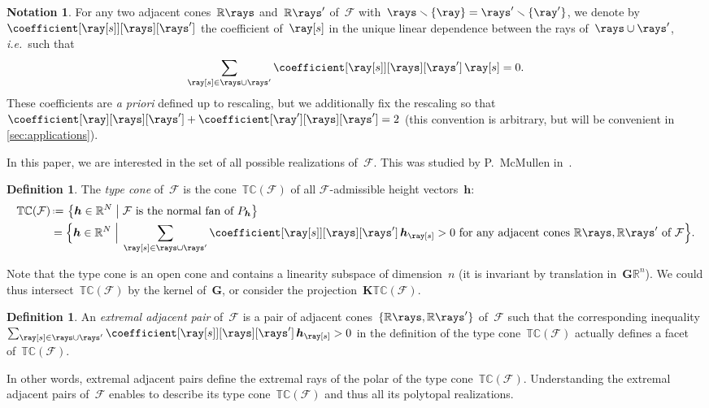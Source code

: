 \documentclass{amsart}
\theoremstyle{definition}
\newtheorem{definition}[theorem]{Definition}
\newtheorem{notation}[theorem]{Notation}
\newcommand{\R}{\mathbb{R}} %
\renewcommand{\b}[1]{{\boldsymbol{#1}}} %
\newcommand{\set}[2]{\left\{ #1 \;\middle|\; #2 \right\}} %
\newcommand{\Bigset}[2]{\Big\{ #1 \;\Big|\; #2 \Big\}} %
\newcommand{\ssm}{\smallsetminus} %
\newcommand{\eqdef}{\mbox{\,\raisebox{0.2ex}{\scriptsize\ensuremath{\mathrm:}}\ensuremath{=}\,}} %
\newcommand{\ie}{\textit{i.e.}~} %
\newcommand{\apriori}{\textit{a priori}} %
\newcommand{\darkblue}{\color{darkblue}} %
\newcommand{\defn}[1]{\textsl{\darkblue #1}} %
\newcommand{\Fan}{\mathcal{F}} %
\newcommand{\typeCone}{\mathbb{TC}} %
\begin{document}
\begin{notation}
For any two adjacent cones~$\R\rays$ and~$\R\rays'$ of~$\Fan$ with~$\rays \ssm \{\ray\} = \rays' \ssm \{\ray'\}$, we denote by~$\coefficient[{\ray[s]}][\rays][\rays']$ the coefficient of~$\ray[s]$ in the unique linear dependence between the rays of~$\rays \cup \rays'$, \ie such that
\[
\sum_{\ray[s] \in \rays \cup \rays'} \coefficient[{\ray[s]}][\rays][\rays'] \, \ray[s] = 0.
\]
These coefficients are \apriori{} defined up to rescaling, but we additionally fix the rescaling so that~${\coefficient[\ray][\rays][\rays'] + \coefficient[\ray'][\rays][\rays'] = 2}$ (this convention is arbitrary, but will be convenient in \cref{sec:applications}).
\end{notation}

In this paper, we are interested in the set of all possible realizations of~$\Fan$. This was studied by P.~McMullen in~\cite{McMullen-typeCone}.

\begin{definition}
The \defn{type cone} of~$\Fan$ is the cone~$\typeCone(\Fan)$ of all $\Fan$-admissible height vectors~$\b{h}$:
\begin{align*}
\typeCone(\Fan) & \eqdef \set{\b{h} \in \R^N}{\Fan \text{ is the normal fan of } P_\b{h}} \\
& = \Bigset{\b{h} \in \R^N}{\sum_{\ray[s] \in \rays \cup \rays'} \coefficient[{\ray[s]}][\rays][\rays'] \, \b{h}_{\ray[s]} > 0 \text{ for any adjacent cones~$\R\rays, \R\rays'$ of~$\Fan$}}.
\end{align*}
\end{definition}

Note that the type cone is an open cone and contains a linearity subspace of dimension~$n$ (it is invariant by translation in~$\b{G} \R^n$). We could thus intersect~$\typeCone(\Fan)$ by the kernel of~$\b{G}$, or consider the projection~$\b{K}\typeCone(\Fan)$.

\begin{definition}
An \defn{extremal adjacent pair} of~$\Fan$ is a pair of adjacent cones~$\{\R\rays, \R\rays'\}$ of~$\Fan$ such that the corresponding inequality $\sum_{\ray[s] \in \rays \cup \rays'} \coefficient[{\ray[s]}][\rays][\rays'] \, \b{h}_{\ray[s]} > 0$ in the definition of the type cone~$\typeCone(\Fan)$ actually defines a facet of~$\typeCone(\Fan)$.
\end{definition}

In other words, extremal adjacent pairs define the extremal rays of the polar of the type cone~$\typeCone(\Fan)$.
Understanding the extremal adjacent pairs of~$\Fan$ enables to describe its type cone~$\typeCone(\Fan)$ and thus all its polytopal realizations.
\end{document}
